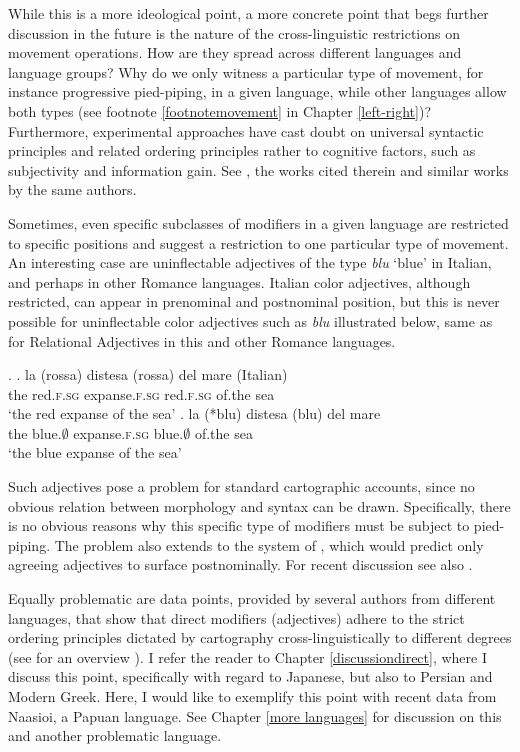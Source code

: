 \documentclass [output=book,colorlinks,citecolor=brown]{langscibook}
\begin{document}
While this is a more ideological point, a more concrete point that begs further discussion in the future is the nature of the cross-linguistic restrictions on movement operations. How are they spread across different languages and language groups? Why do we only witness a particular type of movement, for instance progressive pied-piping, in a given language, while other languages allow both types (see footnote \ref{footnotemovement} in Chapter \ref{left-right})? Furthermore, experimental approaches have cast doubt on universal syntactic principles and related ordering principles rather to cognitive factors, such as subjectivity and information gain. See \citet{scontras:2017:sub, dyer:2024:evaluating}, the works cited therein and similar works by the same authors.

Sometimes, even specific subclasses of modifiers in a given language are restricted to specific positions and suggest a restriction to one particular type of movement. An interesting case are uninflectable adjectives of the type \textit{blu} `blue’ in Italian, and perhaps in other Romance languages. Italian color adjectives, although restricted, can appear in prenominal and postnominal position, but this is never possible for uninflectable color adjectives such as \textit{blu} illustrated below, same as for Relational Adjectives in this and other Romance languages. %

\ex. \ag. la (rossa) distesa (rossa) del mare (Italian)\\
the red.\textsc{f.sg} expanse.\textsc{f.sg} red.\textsc{f.sg} of.the sea\\
`the red expanse of the sea'
\bg. la (*blu) distesa (blu) del mare\\
the blue.\textsc{$\emptyset$} expanse.\textsc{f.sg} blue.\textsc{$\emptyset$} of.the sea\\
`the blue expanse of the sea' \null \hfill \citep[110]{mattiuzzi:2023:influential}

Such adjectives pose a problem for standard cartographic accounts, since no obvious relation between morphology and syntax can be drawn. Specifically, there is no obvious reasons why this specific type of modifiers must be subject to pied-piping. The problem also extends to the system of \citet{laenzlinger:2005:french, laenzlinger:2011:elements}, which would predict only agreeing adjectives to surface postnominally. For recent discussion see also \citet{mattiuzzi:2023:influential}.

Equally problematic are data points, provided by several authors from different languages, that show that direct modifiers (adjectives) adhere to the strict ordering principles dictated by cartography cross-linguistically to different degrees (see for an overview \citealt{manzini:2025:left}). I refer the reader to Chapter \ref{discussiondirect}, where I discuss this point, specifically with regard to Japanese, but also to Persian and Modern Greek. Here, I would like to exemplify this point with recent data from Naasioi, a Papuan language. See Chapter \ref{more languages} for discussion on this and another problematic language.
\end{document}
